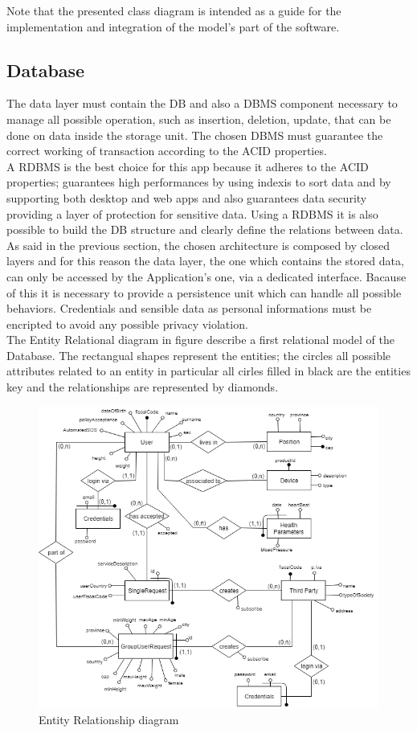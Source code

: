 Note that the presented class diagram is intended as a guide for the implementation and integration of the model's part of the software.


\subsection{Database}
The data layer must contain the DB and also a DBMS component necessary to manage all possible operation, such as insertion, deletion, update, that can be done on data inside the storage unit. The chosen DBMS must guarantee the correct working of transaction according to the ACID properties.\\
A RDBMS is the best choice for this app because it adheres to the ACID properties; guarantees high performances by using indexis to sort data and by supporting both desktop and web apps and also guarantees data security providing a layer of protection for sensitive data. Using a RDBMS it is also possible to build  the DB structure and clearly define the relations between data.\\ 
As said in the previous section, the chosen architecture is composed by closed layers and for this reason  the data layer, the one which contains the stored data, can only be accessed by the Application's one, via a dedicated interface. Bacause of this it is necessary to provide a persistence unit which can handle all possible behaviors. Credentials and sensible data as personal informations must be encripted to avoid any possible privacy violation.\\
The Entity Relational diagram in figure describe a first relational model of the Database. The rectangual shapes represent the entities; the circles all possible attributes related to an entity in particular all cirles filled in black are the entities key and the relationships are represented by diamonds.

\begin{figure}[h!]
	\includegraphics[width=1.0\textwidth]{./pictures/ER_diagram.png}\par
	\caption{Entity Relationship diagram}
\end{figure}
\FloatBarrier
